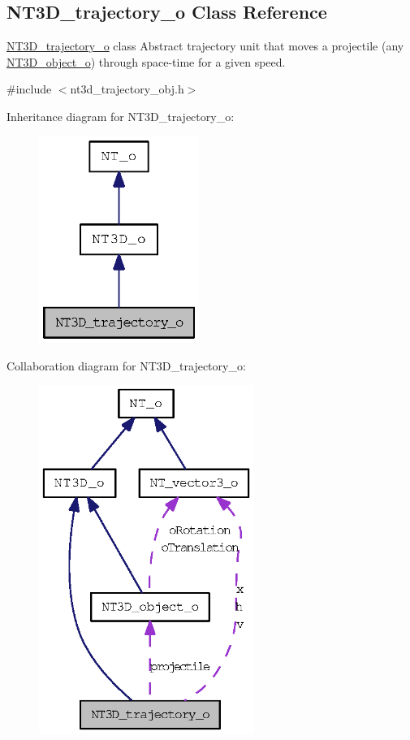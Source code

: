 \subsection{NT3D\_\-trajectory\_\-o Class Reference}
\label{class_n_t3_d__trajectory__o}


\hyperlink{class_n_t3_d__trajectory__o}{NT3D\_\-trajectory\_\-o} class Abstract trajectory unit that moves a projectile (any \hyperlink{class_n_t3_d__object__o}{NT3D\_\-object\_\-o}) through space-\/time for a given speed.  




{\ttfamily \#include $<$nt3d\_\-trajectory\_\-obj.h$>$}



Inheritance diagram for NT3D\_\-trajectory\_\-o:
\nopagebreak
\begin{figure}[H]
\begin{center}
\leavevmode
\includegraphics[width=148pt]{class_n_t3_d__trajectory__o__inherit__graph}
\end{center}
\end{figure}


Collaboration diagram for NT3D\_\-trajectory\_\-o:
\nopagebreak
\begin{figure}[H]
\begin{center}
\leavevmode
\includegraphics[width=198pt]{class_n_t3_d__trajectory__o__coll__graph}
\end{center}
\end{figure}
